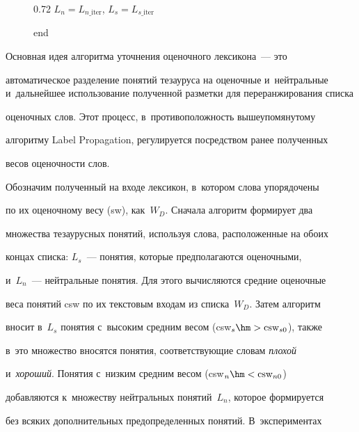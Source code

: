 \begin{figure}[b]
{\begin{center}
\begin{fmpage}{0.72\textwidth}
\hspace{3mm}$L_n = L_{n\_\mathrm{iter}}$, $L_s = L_{s\_\mathrm{iter}}$





\noindent


{\sf end}


\end{fmpage}


\end{center}


}


\end{figure}





	Основная идея алгоритма уточнения оценочного лексикона~--- это


автоматическое разделение понятий тезауруса на оценочные и~нейтральные и~дальнейшее использование полученной разметки для переранжирования списка


оценочных слов. Этот процесс, в~противоположность вышеупомянутому


алгоритму Label Propagation, регулируется посредством ранее полученных


весов оценочности слов.





  	Обозначим полученный на входе лексикон, в~котором слова упорядочены


по их оценочному весу (sw), как~$W_D$. Сначала алгоритм формирует два


множества тезаурусных понятий, используя слова, расположенные на обоих


концах списка: $L_s$~--- понятия, которые предполагаются оценочными,


и~$L_n$~--- нейтральные понятия. Для этого вычисляются средние оценочные


веса понятий csw по их текстовым входам из списка~$W_D$. Затем алгоритм


вносит в~$L_s$ понятия с~высоким средним весом (csw$_s\hm > \mathrm{csw}_{s0}$), также


в~это множество вносятся понятия, соответствующие словам \textit{плохой}


и~\textit{хороший}. Понятия с~низким средним весом (csw$_n \hm< \mathrm{csw}_{n0}$)


добавляются к~множеству нейтральных понятий~$L_n$, которое формируется


без всяких дополнительных предопределенных понятий. В~экспериментах


